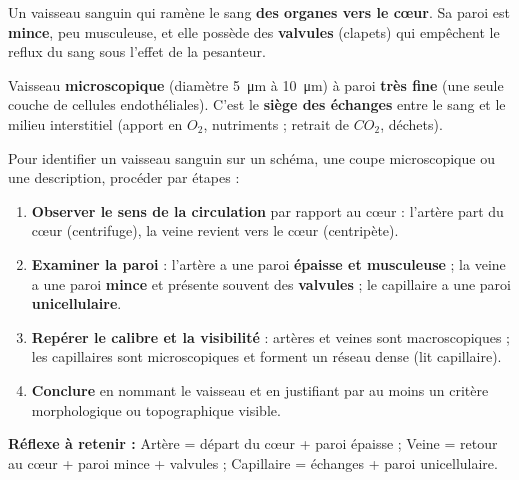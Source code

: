 \documentclass[11pt]{article}
\begin{document}
\begin{definition}[Veine]
Un vaisseau sanguin qui ramène le sang \textbf{des organes vers le cœur}. Sa paroi est \textbf{mince}, peu musculeuse, et elle possède des \textbf{valvules} (clapets) qui empêchent le reflux du sang sous l'effet de la pesanteur.
\end{definition}

\begin{definition}
Vaisseau \textbf{microscopique} (diamètre \SI{5}{\micro\metre} à \SI{10}{\micro\metre}) à paroi \textbf{très fine} (une seule couche de cellules endothéliales). C'est le \textbf{siège des échanges} entre le sang et le milieu interstitiel (apport en $O_2$, nutriments ; retrait de $CO_2$, déchets).
\end{definition}

\begin{methode}
Pour identifier un vaisseau sanguin sur un schéma, une coupe microscopique ou une description, procéder par étapes :
\begin{enumerate}
\item \textbf{Observer le sens de la circulation} par rapport au cœur : l'artère part du cœur (centrifuge), la veine revient vers le cœur (centripète).
\item \textbf{Examiner la paroi} : l'artère a une paroi \textbf{épaisse et musculeuse} ; la veine a une paroi \textbf{mince} et présente souvent des \textbf{valvules} ; le capillaire a une paroi \textbf{unicellulaire}.
\item \textbf{Repérer le calibre et la visibilité} : artères et veines sont macroscopiques ; les capillaires sont microscopiques et forment un réseau dense (lit capillaire).
\item \textbf{Conclure} en nommant le vaisseau et en justifiant par au moins un critère morphologique ou topographique visible.
\end{enumerate}
\textbf{Réflexe à retenir :} Artère = départ du cœur + paroi épaisse ; Veine = retour au cœur + paroi mince + valvules ; Capillaire = échanges + paroi unicellulaire.
\end{methode}
\end{document}
